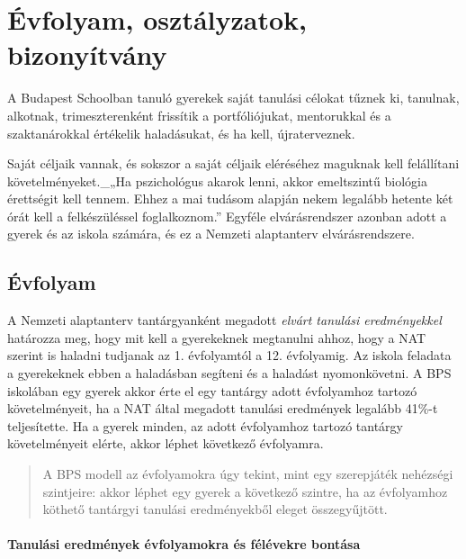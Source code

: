\hypertarget{evfolyam-osztalyzatok-bizonyitvany}{%
\section{Évfolyam, osztályzatok,
bizonyítvány}\label{evfolyam-osztalyzatok-bizonyitvany}}

A Budapest Schoolban tanuló gyerekek saját tanulási célokat tűznek ki,
tanulnak, alkotnak, trimeszterenként frissítik a portfóliójukat,
mentorukkal és a szaktanárokkal értékelik haladásukat, és ha kell,
újraterveznek.

Saját céljaik vannak, és sokszor a saját céljaik eléréséhez maguknak
kell felállítani követelményeket.\_„Ha pszichológus akarok lenni, akkor
emeltszintű biológia érettségit kell tennem. Ehhez a mai tudásom alapján
nekem legalább hetente két órát kell a felkészüléssel foglalkoznom.''
Egyféle elvárásrendszer azonban adott a gyerek és az iskola számára, és
ez a Nemzeti alaptanterv elvárásrendszere.

\hypertarget{evfolyam}{%
\subsection{Évfolyam}\label{evfolyam}}

A Nemzeti alaptanterv tantárgyanként megadott \emph{elvárt tanulási
eredményekkel} határozza meg, hogy mit kell a gyerekeknek megtanulni
ahhoz, hogy a NAT szerint is haladni tudjanak az 1. évfolyamtól a 12.
évfolyamig. Az iskola feladata a gyerekeknek ebben a haladásban segíteni
és a haladást nyomonkövetni. A BPS iskolában egy gyerek akkor érte el
egy tantárgy adott évfolyamhoz tartozó követelményeit, ha a NAT által
megadott tanulási eredmények legalább 41\%-t teljesítette. Ha a gyerek
minden, az adott évfolyamhoz tartozó tantárgy követelményeit elérte,
akkor léphet következő évfolyamra.

\begin{quote}
A BPS modell az évfolyamokra úgy tekint, mint egy
{szerepjáték
nehézségi szintjeire}: akkor léphet egy gyerek a következő szintre, ha
az évfolyamhoz köthető tantárgyi tanulási eredményekből eleget
összegyűjtött.
\end{quote}

\hypertarget{tanulasi-eredmenyek-evfolyamokra-es-felevekre-bontasa}{%
\paragraph{Tanulási eredmények évfolyamokra és félévekre
bontása}\label{tanulasi-eredmenyek-evfolyamokra-es-felevekre-bontasa}}

